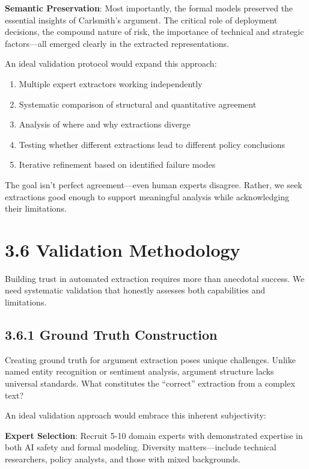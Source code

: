 \documentclass[
  11pt,
  letterpaper,
]{book}
\providecommand{\tightlist}{%
  \setlength{\itemsep}{0pt}\setlength{\parskip}{0pt}}
\begin{document}
\textbf{Semantic Preservation}: Most importantly, the formal models
preserved the essential insights of Carlsmith's argument. The critical
role of deployment decisions, the compound nature of risk, the
importance of technical and strategic factors---all emerged clearly in
the extracted representations.

An ideal validation protocol would expand this approach:

\begin{enumerate}
\def\labelenumi{\arabic{enumi}.}
\tightlist
\item
  Multiple expert extractors working independently
\item
  Systematic comparison of structural and quantitative agreement
\item
  Analysis of where and why extractions diverge
\item
  Testing whether different extractions lead to different policy
  conclusions
\item
  Iterative refinement based on identified failure modes
\end{enumerate}

The goal isn't perfect agreement---even human experts disagree. Rather,
we seek extractions good enough to support meaningful analysis while
acknowledging their limitations.

\section{3.6 Validation Methodology}\label{sec-validation-methodology}

Building trust in automated extraction requires more than anecdotal
success. We need systematic validation that honestly assesses both
capabilities and limitations.

\subsection{3.6.1 Ground Truth Construction}\label{sec-ground-truth}

Creating ground truth for argument extraction poses unique challenges.
Unlike named entity recognition or sentiment analysis, argument
structure lacks universal standards. What constitutes the ``correct''
extraction from a complex text?

An ideal validation approach would embrace this inherent subjectivity:

\textbf{Expert Selection}: Recruit 5-10 domain experts with demonstrated
expertise in both AI safety and formal modeling. Diversity
matters---include technical researchers, policy analysts, and those with
mixed backgrounds.
\end{document}

